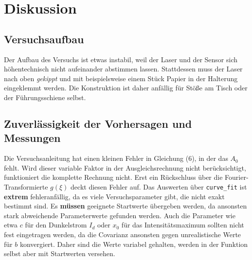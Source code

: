 \section{Diskussion}
\label{sec:Diskussion}

\subsection{Versuchsaufbau}
Der Aufbau des Versuchs ist etwas instabil, weil der Laser und der Sensor sich höhentechnisch nicht aufeinander abstimmen lassen.
Stattdessen muss der Laser nach oben \textit{gekippt} und mit beispielsweise einem Stück Papier in der Halterung eingeklemmt werden.
Die Konstruktion ist daher anfällig für Stöße am Tisch oder der Führungsschiene selbst.

\subsection{Zuverlässigkeit der Vorhersagen und Messungen}
Die Versuchsanleitung hat einen kleinen Fehler in Gleichung (6), in der das $A_0$ fehlt. Wird dieser variable Faktor in der Ausgleichsrechnung nicht berücksichtigt,
funktioniert die komplette Rechnung nicht.
Erst ein Rückschluss über die Fourier-Transformierte $g(\xi)$ deckt diesen Fehler auf.
Das Auswerten über \texttt{curve\_fit} ist \textbf{extrem} fehleranfällig, da es viele Versuchsparameter gibt, die nicht exakt bestimmt sind.
Es \textbf{müssen} geeignete Startwerte übergeben werden, da ansonsten stark abweichende Parameterwerte gefunden werden.
Auch die Parameter wie etwa $c$ für den Dunkelstrom $I_d$ oder $x_0$ für das Intensitätsmaximum sollten nicht fest eingetragen werden, da die Covarianz ansonsten gegen
unrealistische Werte für $b$ konvergiert. Daher sind die Werte variabel gehalten, werden in der Funktion selbst aber mit Startwerten versehen. \\

